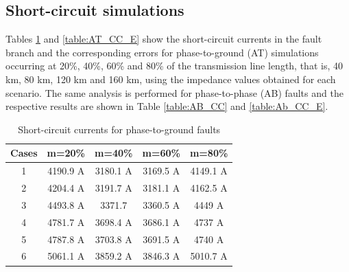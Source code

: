 \documentclass[conference]{IEEEtran}
\begin{document}
	\subsection{Short-circuit simulations}
	
	Tables \ref{table:AT_CC} and \ref{table:AT_CC_E} show the short-circuit currents in the fault branch and the corresponding errors for phase-to-ground (AT) simulations occurring at 20\%, 40\%, 60\% and 80\% of the transmission line length, that is, 40 km, 80 km, 120 km and 160 km, using the impedance values obtained for each scenario. The same analysis is performed for phase-to-phase (AB) faults and the respective results are shown in Table \ref{table:AB_CC} and \ref{table:Ab_CC_E}. 
	
	\begin{table}[!hbt]
		\renewcommand{\arraystretch}{1.3}
		\caption{Short-circuit currents for phase-to-ground faults}
		\label{table:AT_CC}
		\centering
		\begin{tabular}{|c|c|c|c|c|}
			\hline
			\textbf{Cases} & \multicolumn{1}{l|}{\textbf{m=20\%}} & \multicolumn{1}{l|}{\textbf{m=40\%}} & \multicolumn{1}{l|}{\textbf{m=60\%}} & \multicolumn{1}{l|}{\textbf{m=80\%}} \\ \hline
			1              & 4190.9 A                              & 3180.1 A                              & 3169.5 A                              & 4149.1 A                              \\ \hline
			2              & 4204.4 A                              & 3191.7 A                              & 3181.1 A                              & 4162.5 A                              \\ \hline
			3              & 4493.8 A                              & 3371.7                                & 3360.5 A                              & 4449 A                                \\ \hline
			4              & 4781.7 A                              & 3698.4 A                              & 3686.1 A                              & 4737 A                                \\ \hline
			5              & 4787.8 A                              & 3703.8 A                              & 3691.5 A                              & 4740 A                                \\ \hline
			6              & 5061.1 A                              & 3859.2 A                              & 3846.3 A                              & 5010.7 A                              \\ \hline
		\end{tabular}
	\end{table}
	
\end{document}
